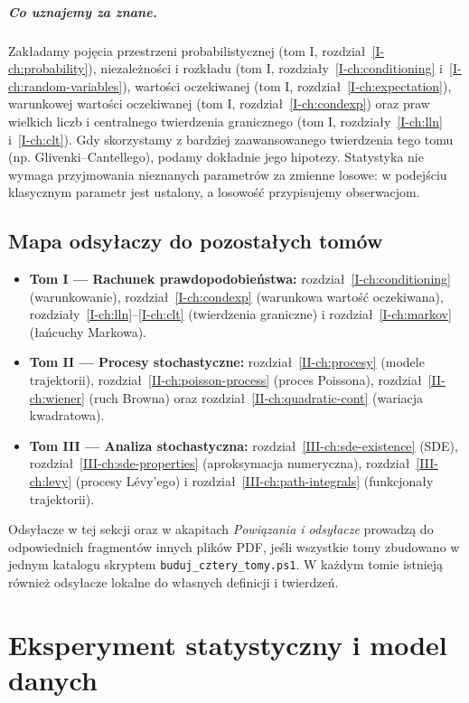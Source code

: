 \documentclass[11pt,a4paper,oneside]{report}
\numberwithin{equation}{chapter}
\theoremstyle{plain}
\theoremstyle{definition}
\theoremstyle{remark}
\begin{document}
\paragraph{Co uznajemy za znane.}
Zakładamy pojęcia przestrzeni probabilistycznej (tom I, rozdział~\ref{I-ch:probability}), niezależności i rozkładu (tom I, rozdziały~\ref{I-ch:conditioning} i~\ref{I-ch:random-variables}), wartości oczekiwanej (tom I, rozdział~\ref{I-ch:expectation}), warunkowej wartości oczekiwanej (tom I, rozdział~\ref{I-ch:condexp}) oraz praw wielkich liczb i centralnego twierdzenia granicznego (tom I, rozdziały~\ref{I-ch:lln} i~\ref{I-ch:clt}). Gdy skorzystamy z bardziej zaawansowanego twierdzenia tego tomu (np. Glivenki--Cantellego), podamy dokładnie jego hipotezy. Statystyka nie wymaga przyjmowania nieznanych parametrów za zmienne losowe: w podejściu klasycznym parametr jest ustalony, a losowość przypisujemy obserwacjom.


\section*{Mapa odsyłaczy do pozostałych tomów}
\begin{itemize}
\item \textbf{Tom I — Rachunek prawdopodobieństwa:} rozdział~\ref{I-ch:conditioning} (warunkowanie), rozdział~\ref{I-ch:condexp} (warunkowa wartość oczekiwana), rozdziały~\ref{I-ch:lln}--\ref{I-ch:clt} (twierdzenia graniczne) i rozdział~\ref{I-ch:markov} (łańcuchy Markowa).
\item \textbf{Tom II — Procesy stochastyczne:} rozdział~\ref{II-ch:procesy} (modele trajektorii), rozdział~\ref{II-ch:poisson-process} (proces Poissona), rozdział~\ref{II-ch:wiener} (ruch Browna) oraz rozdział~\ref{II-ch:quadratic-cont} (wariacja kwadratowa).
\item \textbf{Tom III — Analiza stochastyczna:} rozdział~\ref{III-ch:sde-existence} (SDE), rozdział~\ref{III-ch:sde-properties} (aproksymacja numeryczna), rozdział~\ref{III-ch:levy} (procesy Lévy'ego) i rozdział~\ref{III-ch:path-integrals} (funkcjonały trajektorii).
\end{itemize}
Odsyłacze w tej sekcji oraz w akapitach \emph{Powiązania i odsyłacze} prowadzą do odpowiednich fragmentów innych plików PDF, jeśli wszystkie tomy zbudowano w jednym katalogu skryptem \texttt{buduj\_cztery\_tomy.ps1}. W każdym tomie istnieją również odsyłacze lokalne do własnych definicji i twierdzeń.

\chapter{Eksperyment statystyczny i model danych}
\label{ch:eksperyment}
\end{document}
